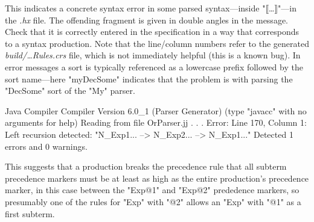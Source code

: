\documentclass[11pt]{article} %
\begin{document}
\begin{error}\leavevmode
  This indicates a concrete syntax error in some parsed syntax---inside "⟦…⟧"---in the \emph{.hx}
  file. The offending fragment is given in double angles in the message. Check that it is correctly
  entered in the \HAX specification in a way that corresponds to a syntax production. Note that the
  line/column numbers refer to the generated \emph{build/…Rules.crs} file, which is not immediately
  helpful (this is a known bug). In error messages a sort is typically referenced as a lowercase
  prefix followed by the sort name---here "myDecSome" indicates that the problem is with parsing the
  "DecSome" sort of the "My" parser.
\end{error}

\begin{error}\leavevmode
  \begin{code}
Java Compiler Compiler Version 6.0_1 (Parser Generator)
(type "javacc" with no arguments for help)
Reading from file OrParser.jj . . .
Error: Line 170, Column 1: Left recursion detected: "N_Exp1... --> N_Exp2... --> N_Exp1..."
Detected 1 errors and 0 warnings.
  \end{code}
  This suggests that a production breaks the precedence rule that all subterm precedence markers
  must be at least as high as the entire production's precedence marker, in this case between the
  "Exp@1" and "Exp@2" prededence markers, so presumably one of the rules for "Exp" with "@2" allows
  an "Exp" with "@1" as a first subterm.
\end{error}
\end{document}
